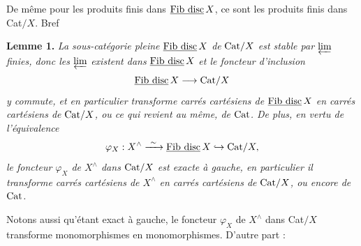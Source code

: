 De même pour les produits finis dans $\underline{\mathrm{Fib\ disc}}\, X$, ce sont les produits finis dans Cat$/X$. Bref

\textbf{Lemme 1.} \textit{La sous-catégorie pleine} $\underline{\mathrm{Fib\ disc}}\, X$ \textit{de} $\mathrm{Cat}/X$ \textit{est stable par} $\varprojlim$ \textit{finies, donc les} $\varprojlim$ \textit{existent dans} $\underline{\mathrm{Fib\ disc}}\, X$ \textit{et le foncteur d'inclusion}
\[
\underline{\mathrm{Fib\ disc}}\, X \longrightarrow \mathrm{Cat}/X
\]
\textit{y commute, et en particulier transforme carrés cartésiens de} $\underline{\mathrm{Fib\ disc}}\, X$ \textit{en carrés cartésiens de} $\mathrm{Cat}/X$\textit{, ou ce qui revient au même, de} $\mathrm{Cat}$\textit{. De plus, en vertu de l'équivalence}
\[
\varphi_X : X^{\wedge} \xrightarrow{\ \sim\ } \underline{\mathrm{Fib\ disc}}\, X \hookrightarrow \mathrm{Cat}/X,
\]
\textit{le foncteur $\varphi_X$ de $X^{\wedge}$ dans} $\mathrm{Cat}/X$ \textit{est exacte à gauche, en particulier il transforme carrés cartésiens de $X^{\wedge}$ en carrés cartésiens de} $\mathrm{Cat}/X$\textit{, ou encore de} $\mathrm{Cat}$\textit{.} %

Notons aussi qu'étant exact à gauche, le foncteur $\varphi_X$ de $X^{\wedge}$ dans Cat$/X$ transforme monomorphismes en monomorphismes. D'autre part :

